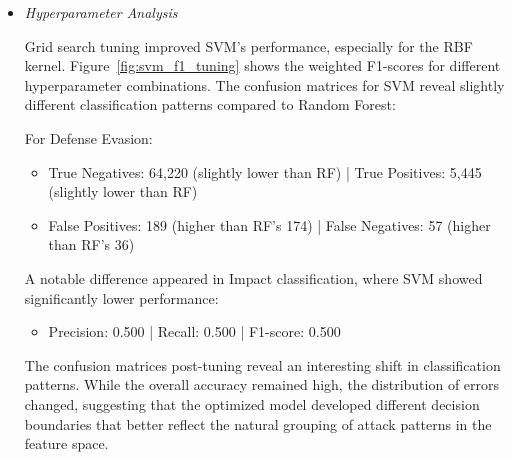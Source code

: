 \begin{itemize}

                \vspace{0.5em}

                \item \textit{Hyperparameter Analysis}
                
                    \vspace{0.3em}
                    

                    Grid search tuning improved SVM's performance, especially for the RBF kernel. Figure~\ref{fig:svm_f1_tuning} shows the weighted F1-scores for different hyperparameter combinations. The confusion matrices for SVM reveal slightly different classification patterns compared to Random Forest:
            
                    For Defense Evasion:
                    
                    \begin{itemize}
                        \item True Negatives: 64,220 (slightly lower than RF) | True Positives: 5,445 (slightly lower than RF)
                        \item False Positives: 189 (higher than RF's 174) | False Negatives: 57 (higher than RF's 36) 
                    \end{itemize}

                    A notable difference appeared in Impact classification, where SVM showed significantly lower performance:
                    
                    \begin{itemize}
                        \item Precision: 0.500 | Recall: 0.500 | F1-score: 0.500
                    \end{itemize}
            
                    The confusion matrices post-tuning reveal an interesting shift in classification patterns. While the overall accuracy remained high, the distribution of errors changed, suggesting that the optimized model developed different decision boundaries that better reflect the natural grouping of attack patterns in the feature space.
                    

                \vspace{0.5em}


\end{itemize}
